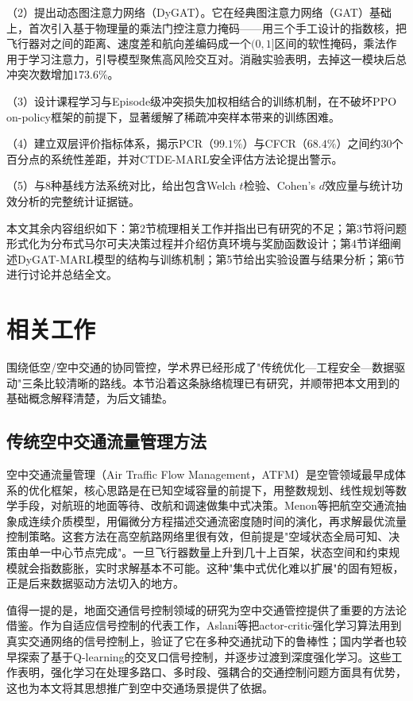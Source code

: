 \documentclass[12pt,a4paper,UTF8]{ctexart}
\begin{document}
（2）提出动态图注意力网络（DyGAT）。它在经典图注意力网络（GAT）基础上，首次引入基于物理量的乘法门控注意力掩码——用三个手工设计的指数核，把飞行器对之间的距离、速度差和航向差编码成一个$(0,1]$区间的软性掩码，乘法作用于学习注意力，引导模型聚焦高风险交互对。消融实验表明，去掉这一模块后总冲突次数增加$173.6\%$。

（3）设计课程学习与Episode级冲突损失加权相结合的训练机制，在不破坏PPO on-policy框架的前提下，显著缓解了稀疏冲突样本带来的训练困难。

（4）建立双层评价指标体系，揭示PCR（$99.1\%$）与CFCR（$68.4\%$）之间约30个百分点的系统性差距，并对CTDE-MARL安全评估方法论提出警示。

（5）与8种基线方法系统对比，给出包含Welch $t$检验、Cohen's $d$效应量与统计功效分析的完整统计证据链。

本文其余内容组织如下：第2节梳理相关工作并指出已有研究的不足；第3节将问题形式化为分布式马尔可夫决策过程并介绍仿真环境与奖励函数设计；第4节详细阐述DyGAT-MARL模型的结构与训练机制；第5节给出实验设置与结果分析；第6节进行讨论并总结全文。

\section{相关工作}

围绕低空/空中交通的协同管控，学术界已经形成了"传统优化—工程安全—数据驱动"三条比较清晰的路线。本节沿着这条脉络梳理已有研究，并顺带把本文用到的基础概念解释清楚，为后文铺垫。

\subsection{传统空中交通流量管理方法}

空中交通流量管理（Air Traffic Flow Management，ATFM）是空管领域最早成体系的优化框架，核心思路是在已知空域容量的前提下，用整数规划、线性规划等数学手段，对航班的地面等待、改航和调速做集中式决策。Menon等\cite{ref2}把航空交通流抽象成连续介质模型，用偏微分方程描述交通流密度随时间的演化，再求解最优流量控制策略。这套方法在高空航路网络里很有效，但前提是"空域状态全局可知、决策由单一中心节点完成"。一旦飞行器数量上升到几十上百架，状态空间和约束规模就会指数膨胀，实时求解基本不可能。这种"集中式优化难以扩展"的固有短板，正是后来数据驱动方法切入的地方。

值得一提的是，地面交通信号控制领域的研究为空中交通管控提供了重要的方法论借鉴。作为自适应信号控制的代表工作，Aslani等\cite{ref12}把actor-critic强化学习算法用到真实交通网络的信号控制上，验证了它在多种交通扰动下的鲁棒性；国内学者也较早探索了基于Q-learning的交叉口信号控制\cite{ref16,ref19,ref20}，并逐步过渡到深度强化学习\cite{ref15,ref17,ref18,ref22}。这些工作表明，强化学习在处理多路口、多时段、强耦合的交通控制问题方面具有优势，这也为本文将其思想推广到空中交通场景提供了依据。
\end{document}
